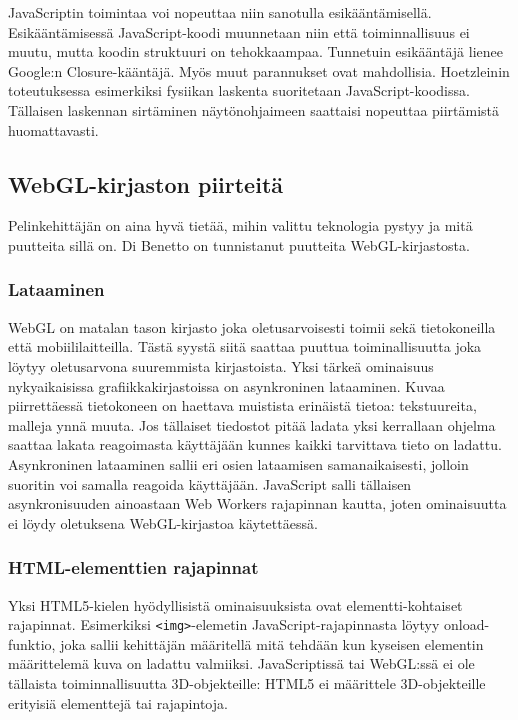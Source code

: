 JavaScriptin toimintaa voi nopeuttaa niin sanotulla esikääntämisellä. Esikääntämisessä JavaScript-koodi muunnetaan niin että toiminnallisuus ei muutu, mutta koodin struktuuri on tehokkaampaa. Tunnetuin esikääntäjä lienee Google:n Closure-kääntäjä\cite{googleclosure}. Myös muut parannukset ovat mahdollisia. Hoetzleinin\cite{hoetzlein} toteutuksessa esimerkiksi fysiikan laskenta suoritetaan JavaScript-koodissa. Tällaisen laskennan sirtäminen näytönohjaimeen saattaisi nopeuttaa piirtämistä huomattavasti.

\subsection{WebGL-kirjaston piirteitä}
\label{subsec:piirteet}

Pelinkehittäjän on aina hyvä tietää, mihin valittu teknologia pystyy ja mitä puutteita sillä on. Di Benetto\cite{dibenedettoSpider} on tunnistanut puutteita WebGL-kirjastosta.

\subsubsection{Lataaminen}
WebGL on matalan tason kirjasto joka oletusarvoisesti toimii sekä tietokoneilla että mobiililaitteilla. Tästä syystä siitä saattaa puuttua toiminallisuutta joka löytyy oletusarvona suuremmista kirjastoista.
Yksi tärkeä ominaisuus nykyaikaisissa grafiikkakirjastoissa on asynkroninen lataaminen. Kuvaa piirrettäessä tietokoneen on haettava muistista erinäistä tietoa: tekstuureita, malleja ynnä muuta. Jos tällaiset tiedostot pitää ladata yksi kerrallaan ohjelma saattaa lakata reagoimasta käyttäjään kunnes kaikki tarvittava tieto on ladattu. Asynkroninen lataaminen sallii eri osien lataamisen samanaikaisesti, jolloin suoritin voi samalla reagoida käyttäjään. JavaScript salli tällaisen asynkronisuuden ainoastaan Web Workers rajapinnan kautta\cite{htmlwebworkers}, joten ominaisuutta ei löydy oletuksena WebGL-kirjastoa käytettäessä.

\subsubsection{HTML-elementtien rajapinnat}
Yksi HTML5-kielen hyödyllisistä ominaisuuksista ovat elementti-kohtaiset rajapinnat. Esimerkiksi \texttt{<img>}-elemetin JavaScript-rajapinnasta löytyy onload-funktio, joka sallii kehittäjän määritellä mitä tehdään kun kyseisen elementin määrittelemä kuva on ladattu valmiiksi. JavaScriptissä tai WebGL:ssä ei ole tällaista toiminnallisuutta 3D-objekteille: HTML5 ei määrittele 3D-objekteille erityisiä elementtejä tai rajapintoja.

